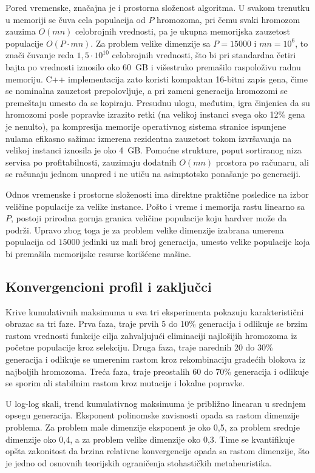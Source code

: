 \documentclass[12pt]{article}
\begin{document}
Pored vremenske, značajna je i prostorna složenost algoritma. U svakom trenutku u memoriji se čuva cela populacija od $P$ hromozoma, pri čemu svaki hromozom zauzima $O(mn)$ celobrojnih vrednosti, pa je ukupna memorijska zauzetost populacije $O(P \cdot mn)$. Za problem velike dimenzije sa $P = 15000$ i $mn = 10^6$, to znači čuvanje reda $1{,}5 \cdot 10^{10}$ celobrojnih vrednosti, što bi pri standardna četiri bajta po vrednosti iznosilo oko 60~GB i višestruko premašilo raspoloživu radnu memoriju. C++ implementacija zato koristi kompaktan 16-bitni zapis gena, čime se nominalna zauzetost prepolovljuje, a pri zameni generacija hromozomi se premeštaju umesto da se kopiraju. Presudnu ulogu, međutim, igra činjenica da su hromozomi posle popravke izrazito retki (na velikoj instanci svega oko 12\% gena je nenulto), pa kompresija memorije operativnog sistema stranice ispunjene nulama efikasno sažima: izmerena rezidentna zauzetost tokom izvršavanja na velikoj instanci iznosila je oko 4~GB. Pomoćne strukture, poput sortiranog niza servisa po profitabilnosti, zauzimaju dodatnih $O(mn)$ prostora po računaru, ali se računaju jednom unapred i ne utiču na asimptotsko ponašanje po generaciji.

Odnos vremenske i prostorne složenosti ima direktne praktične posledice na izbor veličine populacije za velike instance. Pošto i vreme i memorija rastu linearno sa $P$, postoji prirodna gornja granica veličine populacije koju hardver može da podrži. Upravo zbog toga je za problem velike dimenzije izabrana umerena populacija od $15000$ jedinki uz mali broj generacija, umesto velike populacije koja bi premašila memorijske resurse korišćene mašine.

\subsection{Konvergencioni profil i zaključci}

Krive kumulativnih maksimuma u sva tri eksperimenta pokazuju karakteristični obrazac sa tri faze. Prva faza, traje prvih 5 do 10\% generacija i odlikuje se brzim rastom vrednosti funkcije cilja zahvaljujući eliminaciji najlošijih hromozoma iz početne populacije kroz selekciju. Druga faza, traje narednih 20 do 30\% generacija i odlikuje se umerenim rastom kroz rekombinaciju gradećih blokova iz najboljih hromozoma. Treća faza, traje preostalih 60 do 70\% generacija i odlikuje se sporim ali stabilnim rastom kroz mutacije i lokalne popravke.

U log-log skali, trend kumulativnog maksimuma je približno linearan u srednjem opsegu generacija. Eksponent polinomske zavisnosti opada sa rastom dimenzije problema. Za problem male dimenzije eksponent je oko 0,5, za problem srednje dimenzije oko 0,4, a za problem velike dimenzije oko 0,3. Time se kvantifikuje opšta zakonitost da brzina relativne konvergencije opada sa rastom dimenzije, što je jedno od osnovnih teorijskih ograničenja stohastičkih metaheuristika.
\end{document}
